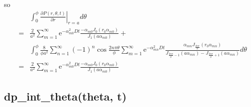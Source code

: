 \documentclass{article}
\begin{document}
so
\begin{eqnarray}
    & & \int^{\phi}_{0}
        \left.\frac{\partial P(r, \theta, t)}{\partial r}\right|_{r = a}d\theta
        \nonumber\\
    &=& \frac{2}{a^2} \sum^{\infty}_{m=1}
        \mathrm{e}^{-\alpha_{m0}^2Dt}
        \frac{-\alpha_{m0}J_0(r_0\alpha_{m0})}{J_1(a\alpha_{m0})} +\nonumber\\
    & & \int^{\phi}_{0}
        \frac{8}{\phi a^2}\sum^{\infty}_{n=1}
        (-1)^n\cos\frac{2n\pi\theta}{\phi}
        \sum^{\infty}_{m=1}
        \mathrm{e}^{-\alpha_{mn}^2Dt}
        \frac{\alpha_{mn}J_{\frac{2n\pi}{\phi}}(r_0\alpha_{mn})}
             {J_{\frac{2n\pi}{\phi} - 1}(a\alpha_{mn}) -
              J_{\frac{2n\pi}{\phi} + 1}(a\alpha_{mn})}
        d\theta\nonumber\\
    &=& \frac{2}{a^2} \sum^{\infty}_{m=1}
        \mathrm{e}^{-\alpha_{m0}^2Dt}
        \frac{-\alpha_{m0}J_0(r_0\alpha_{m0})}{J_1(a\alpha_{m0})}\nonumber
\end{eqnarray}

\subsection{dp\_int\_theta(theta, t)}
\end{document}
